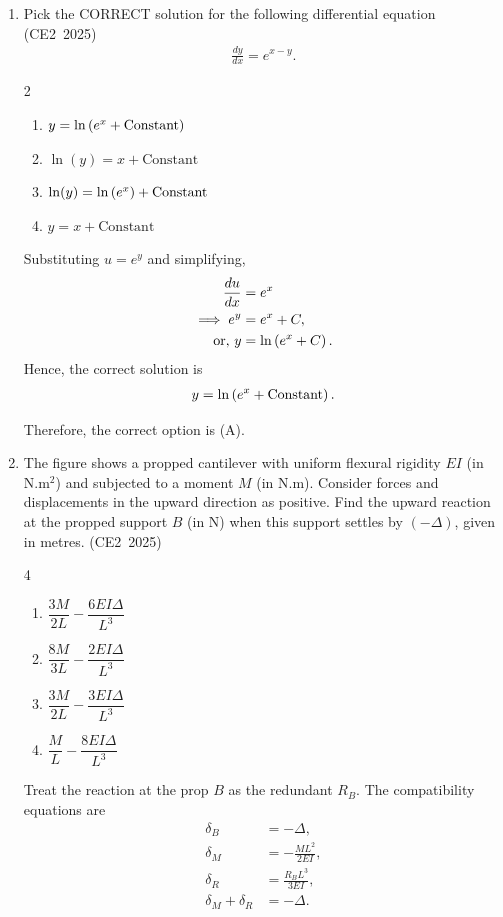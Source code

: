 \begin{enumerate}[label=\thesubsection.\arabic*, ref=\thesubsection.\theenumi,itemsep=0pt]
\item
Pick the CORRECT solution for the following differential equation
\hfill (CE2~2025)
\begin{align}
\frac{dy}{dx}=e^{x-y}.
\end{align}
%
\begin{multicols}{2}\begin{enumerate}
    \item $y=\ln\left(e^x+\text{Constant}\right)$
    \item $\ln(y)=x+\text{Constant}$
    \item $\ln(y)=\ln\left(e^x\right)+\text{Constant}$
    \item $y=x+\text{Constant}$
\end{enumerate}\end{multicols}
%
\solution
Substituting $u=e^y$ and simplifying,
\begin{align}
\frac{du}{dx}&=e^x
\\
\implies e^y&=e^x+C,
\\
\text{or, }y&=\ln\left(e^x+C\right).
\end{align}
%
\iffalse
Hence, the correct solution is
\begin{align}
y=\ln\left(e^x+\text{Constant}\right).
\end{align}

Therefore, the correct option is (A).


\item
The figure shows a propped cantilever with uniform flexural rigidity $EI$
(in N.m$^2$) and subjected to a moment $M$ (in N.m). Consider forces and
displacements in the upward direction as positive. Find the upward reaction
at the propped support $B$ (in N) when this support settles by $(-\Delta)$,
given in metres.
\hfill (CE2~2025)

\begin{multicols}{4}\begin{enumerate}
    \item $\dfrac{3M}{2L}-\dfrac{6EI\Delta}{L^3}$
    \item $\dfrac{8M}{3L}-\dfrac{2EI\Delta}{L^3}$
    \item $\dfrac{3M}{2L}-\dfrac{3EI\Delta}{L^3}$
    \item $\dfrac{M}{L}-\dfrac{8EI\Delta}{L^3}$
\end{enumerate}\end{multicols}

\solution
Treat the reaction at the prop $B$ as the redundant $R_B$.
The compatibility equations are
\begin{align}
\delta_B&=-\Delta,\\
\delta_M&=-\frac{ML^2}{2EI},\\
\delta_R&=\frac{R_BL^3}{3EI},\\
\delta_M+\delta_R&=-\Delta.
\end{align}


\end{enumerate}
